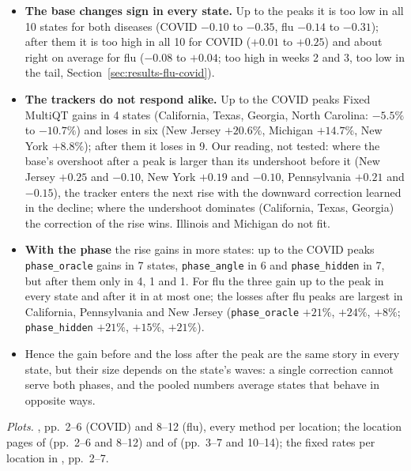 \documentclass[11pt,a4paper]{article}
\theoremstyle{definition}
\theoremstyle{remark}
\begin{document}
\begin{itemize}[leftmargin=*,itemsep=3pt]
\item \textbf{The base changes sign in every state.} Up to the peaks it is
too low in all 10 states for both diseases (COVID $-0.10$ to $-0.35$, flu
$-0.14$ to $-0.31$); after them it is too high in all 10 for COVID ($+0.01$
to $+0.25$) and about right on average for flu ($-0.08$ to $+0.04$; too high
in weeks 2 and 3, too low in the tail, Section~\ref{sec:results-flu-covid}).
\item \textbf{The trackers do not respond alike.} Up to the COVID peaks
Fixed MultiQT gains in 4 states (California, Texas, Georgia, North
Carolina: $-5.5\%$ to $-10.7\%$) and loses in six (New Jersey $+20.6\%$,
Michigan $+14.7\%$, New York $+8.8\%$); after them it loses in 9. Our
reading, not tested: where the base's overshoot after a peak is larger than
its undershoot before it (New Jersey $+0.25$ and $-0.10$, New York $+0.19$
and $-0.10$, Pennsylvania $+0.21$ and $-0.15$), the tracker enters the next
rise with the downward correction learned in the decline; where the
undershoot dominates (California, Texas, Georgia) the correction of the
rise wins. Illinois and Michigan do not fit.
\item \textbf{With the phase} the rise gains in more states: up to the COVID
peaks \texttt{phase\_oracle} gains in 7 states, \texttt{phase\_angle} in 6
and \texttt{phase\_hidden} in 7, but after them only in 4, 1 and 1. For flu
the three gain up to the peak in every state and after it in at most one;
the losses after flu peaks are largest in California, Pennsylvania and New
Jersey (\texttt{phase\_oracle} $+21\%$, $+24\%$, $+8\%$;
\texttt{phase\_hidden} $+21\%$, $+15\%$, $+21\%$).
\item Hence the gain before and the loss after the peak are the same story
in every state, but their size depends on the state's waves: a single
correction cannot serve both phases, and the pooled numbers average states
that behave in opposite ways.
\end{itemize}
\emph{Plots.} , pp.~2--6 (COVID) and 8--12
(flu), every method per location; the location pages of
 (pp.~2--6 and 8--12) and of
 (pp.~3--7 and 10--14); the fixed
rates per location in , pp.~2--7.
\end{document}
